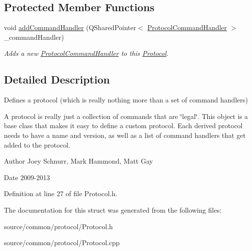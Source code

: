 \subsection*{Protected Member Functions}
\begin{DoxyCompactItemize}
\item 
\hypertarget{struct_picto_1_1_protocol_acad0c456355ddd7d842c7cadd195a3d2}{void \hyperlink{struct_picto_1_1_protocol_acad0c456355ddd7d842c7cadd195a3d2}{add\-Command\-Handler} (Q\-Shared\-Pointer$<$ \hyperlink{struct_picto_1_1_protocol_command_handler}{Protocol\-Command\-Handler} $>$ \-\_\-command\-Handler)}\label{struct_picto_1_1_protocol_acad0c456355ddd7d842c7cadd195a3d2}

\begin{DoxyCompactList}\small\item\em Adds a new \hyperlink{struct_picto_1_1_protocol_command_handler}{Protocol\-Command\-Handler} to this \hyperlink{struct_picto_1_1_protocol}{Protocol}. \end{DoxyCompactList}\end{DoxyCompactItemize}


\subsection{Detailed Description}
Defines a protocol (which is really nothing more than a set of command handlers) 

A protocol is really just a collection of commands that are \char`\"{}legal\char`\"{}. This object is a base class that makes it easy to define a custom protocol. Each derived protocol needs to have a name and version, as well as a list of command handlers that get added to the protocol. \begin{DoxyAuthor}{Author}
Joey Schnurr, Mark Hammond, Matt Gay 
\end{DoxyAuthor}
\begin{DoxyDate}{Date}
2009-\/2013 
\end{DoxyDate}


Definition at line 27 of file Protocol.\-h.



The documentation for this struct was generated from the following files\-:\begin{DoxyCompactItemize}
\item 
source/common/protocol/Protocol.\-h\item 
source/common/protocol/Protocol.\-cpp\end{DoxyCompactItemize}
